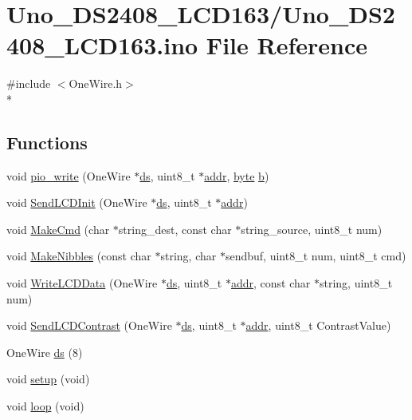 \hypertarget{Uno__DS2408__LCD163_8ino}{\section{Uno\-\_\-\-D\-S2408\-\_\-\-L\-C\-D163/\-Uno\-\_\-\-D\-S2408\-\_\-\-L\-C\-D163.ino File Reference}
\label{Uno__DS2408__LCD163_8ino}
}
{\ttfamily \#include $<$One\-Wire.\-h$>$}\\*
\subsection*{Functions}
\begin{DoxyCompactItemize}
\item 
void \hyperlink{Uno__DS2408__LCD163_8ino_a1e26c3a08c3767822ad391876a888fcf}{pio\-\_\-write} (One\-Wire $\ast$\hyperlink{OWRain1_8ino_af75456870b9486275b406e13b003fb11}{ds}, uint8\-\_\-t $\ast$\hyperlink{OWP__DG__1w-adaptor_8ino_a0fc5da2e63a94559429ec9aec32f1831}{addr}, \hyperlink{Arduino_8h_ab8ef12fab634c171394422d0ee8baf94}{byte} \hyperlink{IMU_8cpp_a20f3a6e8a2ba2537edf801801628417b}{b})
\item 
void \hyperlink{Uno__DS2408__LCD163_8ino_a0346e7b740407034d2bd4974762115d5}{Send\-L\-C\-D\-Init} (One\-Wire $\ast$\hyperlink{OWRain1_8ino_af75456870b9486275b406e13b003fb11}{ds}, uint8\-\_\-t $\ast$\hyperlink{OWP__DG__1w-adaptor_8ino_a0fc5da2e63a94559429ec9aec32f1831}{addr})
\item 
void \hyperlink{Uno__DS2408__LCD163_8ino_a34e523420897686f200125c51e7ef477}{Make\-Cmd} (char $\ast$string\-\_\-dest, const char $\ast$string\-\_\-source, uint8\-\_\-t num)
\item 
void \hyperlink{Uno__DS2408__LCD163_8ino_af148812f3aa653dad493157fd0b7d7f8}{Make\-Nibbles} (const char $\ast$string, char $\ast$sendbuf, uint8\-\_\-t num, uint8\-\_\-t cmd)
\item 
void \hyperlink{Uno__DS2408__LCD163_8ino_aab2d9ea3e3ecace8e6d48c296ec9b622}{Write\-L\-C\-D\-Data} (One\-Wire $\ast$\hyperlink{OWRain1_8ino_af75456870b9486275b406e13b003fb11}{ds}, uint8\-\_\-t $\ast$\hyperlink{OWP__DG__1w-adaptor_8ino_a0fc5da2e63a94559429ec9aec32f1831}{addr}, const char $\ast$string, uint8\-\_\-t num)
\item 
void \hyperlink{Uno__DS2408__LCD163_8ino_a7e7f45f7deffa7054df42395788edf9c}{Send\-L\-C\-D\-Contrast} (One\-Wire $\ast$\hyperlink{OWRain1_8ino_af75456870b9486275b406e13b003fb11}{ds}, uint8\-\_\-t $\ast$\hyperlink{OWP__DG__1w-adaptor_8ino_a0fc5da2e63a94559429ec9aec32f1831}{addr}, uint8\-\_\-t Contrast\-Value)
\item 
One\-Wire \hyperlink{Uno__DS2408__LCD163_8ino_a7c78cdb37808e2d6d5aaab9ea7aca561}{ds} (8)
\item 
void \hyperlink{Uno__DS2408__LCD163_8ino_a7dfd9b79bc5a37d7df40207afbc5431f}{setup} (void)
\item 
void \hyperlink{Uno__DS2408__LCD163_8ino_a0b33edabd7f1c4e4a0bf32c67269be2f}{loop} (void)
\end{DoxyCompactItemize}
